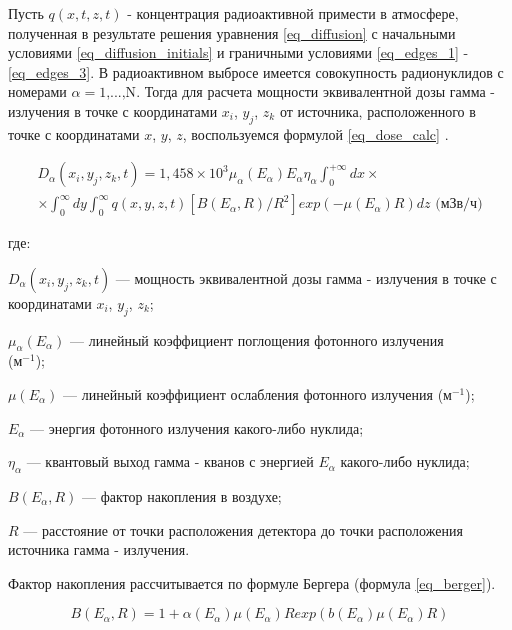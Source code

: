 Пусть $q(x,t,z,t)$ - концентрация радиоактивной примести в атмосфере, полученная в результате решения уравнения
\ref{eq_diffusion} с начальными условиями \ref{eq_diffusion_initials} и граничными условиями \ref{eq_edges_1} -
\ref{eq_edges_3}. В радиоактивном выбросе имеется совокупность радионуклидов с номерами $\alpha = 1\text{,...,N}$.
Тогда для расчета мощности эквивалентной дозы гамма - излучения в точке с координатами $x_i$, $y_j$, $z_k$ от источника, 
расположенного в точке с координатами $x$, $y$, $z$, воспользуемся формулой \ref{eq_dose_calc} \cite{elokhin}.

\begin{equation}
    \begin{aligned}
        \label{eq_dose_calc}
        D_{\alpha}(x_i, y_j, z_k, t) = 1,458 \times 10^{3} \mu_{\alpha}(E_{\alpha}) E_{\alpha} \eta_{\alpha} \int_{0}^{+\infty}
            dx \times \\ \times \int_{0}^{\infty} dy \int_{0}^{\infty} q(x, y, z, t) [B(E_{\alpha}, R) / R^{2}] exp(-\mu(E_{\alpha})
            R) dz \text{ (мЗв/ч)}
    \end{aligned}
\end{equation}

где:
\begin{description}
    \item $D_{\alpha}(x_i, y_j, z_k, t)$ --- мощность эквивалентной дозы гамма - излучения в точке с координатами $x_i$,
        $y_j$, $z_k$;
    \item $\mu_{\alpha}(E_{\alpha})$ --- линейный коэффициент поглощения фотонного излучения \\ (м$^{-1}$);
    \item $\mu(E_{\alpha})$ --- линейный коэффициент ослабления фотонного излучения (м$^{-1}$);
    \item $E_{\alpha}$ --- энергия фотонного излучения какого-либо нуклида;
    \item $\eta_{\alpha}$ --- квантовый выход гамма - кванов с энергией $E_{\alpha}$ какого-либо нуклида;
    \item $B(E_{\alpha}, R)$ --- фактор накопления в воздухе;
    \item $R$ --- расстояние от точки расположения детектора до точки расположения источника гамма - излучения.
\end{description}

Фактор накопления рассчитывается по формуле Бергера \cite{mashkovich} (формула \ref{eq_berger}).

\begin{equation}
    \label{eq_berger}
    B(E_{\alpha}, R) = 1 + \alpha(E_{\alpha}) \mu(E_{\alpha}) R exp(b(E_{\alpha}) \mu(E_{\alpha}) R)
\end{equation}

